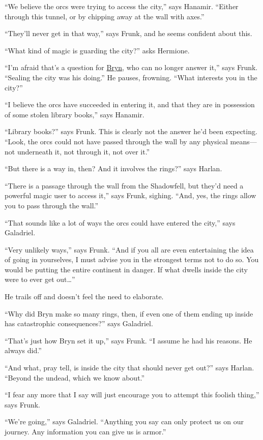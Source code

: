 \documentclass[smalldemyvopaper,11pt,twoside,onecolumn,openright,extrafontsizes]{memoir}
\begin{document}
``We believe the orcs were trying to access the city,'' says Hanamir.
``Either through this tunnel, or by chipping away at the wall with
axes.''

``They'll never get in that way,'' says Frunk, and he seems confident
about this.

``What kind of magic is guarding the city?'' asks Hermione.

``I'm afraid that's a question for \href{/characters/bryn/}{Bryn}, who
can no longer answer it,'' says Frunk. ``Sealing the city was his
doing.'' He pauses, frowning. ``What interests you in the city?''

``I believe the orcs have succeeded in entering it, and that they are in
possession of some stolen library books,'' says Hanamir.

``Library books?'' says Frunk. This is clearly not the answer he'd been
expecting. ``Look, the orcs could not have passed through the wall by
any physical means---not underneath it, not through it, not over it.''

``But there is a way in, then? And it involves the rings?'' says Harlan.

``There is a passage through the wall from the Shadowfell, but they'd
need a powerful magic user to access it,'' says Frunk, sighing. ``And,
yes, the rings allow you to pass through the wall.''

``That sounds like a lot of ways the orcs could have entered the city,''
says Galadriel.

``Very unlikely ways,'' says Frunk. ``And if you all are even
entertaining the idea of going in yourselves, I must advise you in the
strongest terms not to do so. You would be putting the entire continent
in danger. If what dwells inside the city were to ever get out\ldots{}''

He trails off and doesn't feel the need to elaborate.

``Why did Bryn make so many rings, then, if even one of them ending up
inside has catastrophic consequences?'' says Galadriel.

``That's just how Bryn set it up,'' says Frunk. ``I assume he had his
reasons. He always did.''

``And what, pray tell, is inside the city that should never get out?''
says Harlan. ``Beyond the undead, which we know about.''

``I fear any more that I say will just encourage you to attempt this
foolish thing,'' says Frunk.

``We're going,'' says Galadriel. ``Anything you say can only protect us
on our journey. Any information you can give us is armor.''
\end{document}
